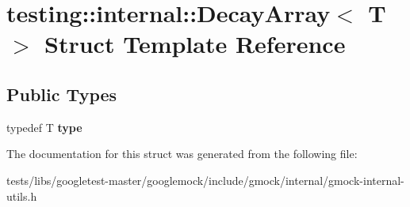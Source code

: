 \hypertarget{structtesting_1_1internal_1_1DecayArray}{}\section{testing\+:\+:internal\+:\+:Decay\+Array$<$ T $>$ Struct Template Reference}
\label{structtesting_1_1internal_1_1DecayArray}
\subsection*{Public Types}
\begin{DoxyCompactItemize}
\item 
\mbox{\label{structtesting_1_1internal_1_1DecayArray_a39803f9bafd56bc4531f86eb34fe9c0f}} 
typedef T {\bfseries type}
\end{DoxyCompactItemize}


The documentation for this struct was generated from the following file\+:\begin{DoxyCompactItemize}
\item 
tests/libs/googletest-\/master/googlemock/include/gmock/internal/gmock-\/internal-\/utils.\+h\end{DoxyCompactItemize}
